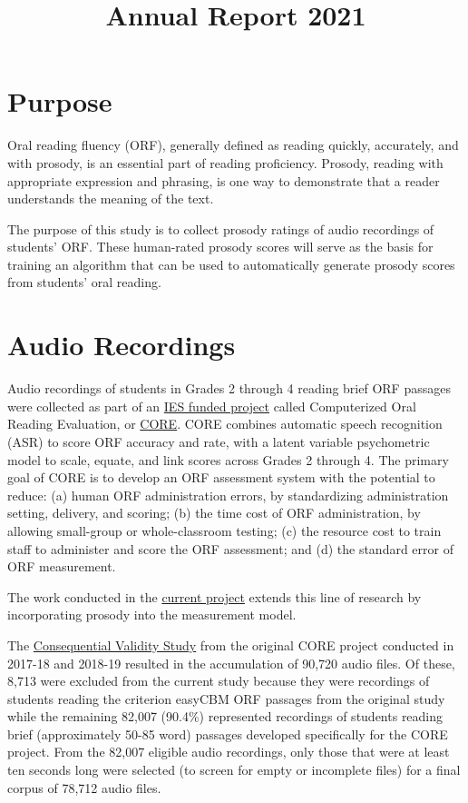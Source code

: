 \documentclass[
]{article}
\title{Annual Report 2021}
\author{}
\date{\vspace{-2.5em}}
\begin{document}
\maketitle

\hypertarget{purpose}{%
\section{Purpose}\label{purpose}}

Oral reading fluency (ORF), generally defined as reading quickly,
accurately, and with prosody, is an essential part of reading
proficiency. Prosody, reading with appropriate expression and phrasing,
is one way to demonstrate that a reader understands the meaning of the
text.

The purpose of this study is to collect prosody ratings of audio
recordings of students' ORF. These human-rated prosody scores will serve
as the basis for training an algorithm that can be used to automatically
generate prosody scores from students' oral reading.

\hypertarget{audio-recordings}{%
\section{Audio Recordings}\label{audio-recordings}}

Audio recordings of students in Grades 2 through 4 reading brief ORF
passages were collected as part of an
\href{https://ies.ed.gov/funding/grantsearch/details.asp?ID=1492}{IES
funded project} called Computerized Oral Reading Evaluation, or
\href{https://jnese.github.io/core-blog/}{CORE}. CORE combines automatic
speech recognition (ASR) to score ORF accuracy and rate, with a latent
variable psychometric model to scale, equate, and link scores across
Grades 2 through 4. The primary goal of CORE is to develop an ORF
assessment system with the potential to reduce: (a) human ORF
administration errors, by standardizing administration setting,
delivery, and scoring; (b) the time cost of ORF administration, by
allowing small-group or whole-classroom testing; (c) the resource cost
to train staff to administer and score the ORF assessment; and (d) the
standard error of ORF measurement.

The work conducted in the
\href{https://ies.ed.gov/funding/grantsearch/details.asp?ID=3427}{current
project} extends this line of research by incorporating prosody into the
measurement model.

The
\href{https://jnese.github.io/core-blog/posts/2019-04-12-consequential-validity-study-procedures/}{Consequential
Validity Study} from the original CORE project conducted in 2017-18 and
2018-19 resulted in the accumulation of 90,720 audio files. Of these,
8,713 were excluded from the current study because they were recordings
of students reading the criterion easyCBM ORF passages from the original
study while the remaining 82,007 (90.4\%) represented recordings of
students reading brief (approximately 50-85 word) passages developed
specifically for the CORE project. From the 82,007 eligible audio
recordings, only those that were at least ten seconds long were selected
(to screen for empty or incomplete files) for a final corpus of 78,712
audio files.
\end{document}
